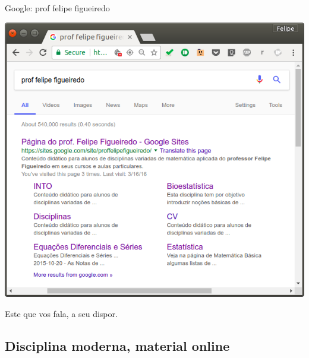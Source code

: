 \documentclass{beamer}
\begin{document}
\begin{frame}{Google: prof felipe figueiredo}
  \begin{center}
    \includegraphics[height=.7\textheight]{Intro/felipefigueiredo}
    \begin{exampleblock}{}
      \begin{center}
        Este que vos fala, a seu dispor.
      \end{center}
    \end{exampleblock}
  \end{center}
\end{frame}

\subsection{Disciplina moderna, material online}

\end{document}
